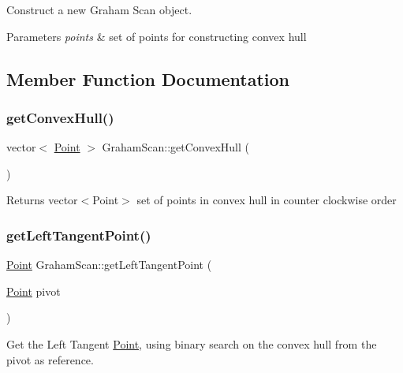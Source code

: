 Construct a new Graham Scan object. 


\begin{DoxyParams}{Parameters}
{\em points} & set of points for constructing convex hull \\
\hline
\end{DoxyParams}


\subsection{Member Function Documentation}
\mbox{\label{classGrahamScan_a374db012cb6a96fcb8530d07cddd498e}} 
\subsubsection{\texorpdfstring{get\+Convex\+Hull()}{getConvexHull()}}
{\footnotesize\ttfamily vector$<$ \mbox{\hyperlink{classPoint}{Point}} $>$ Graham\+Scan\+::get\+Convex\+Hull (\begin{DoxyParamCaption}{ }\end{DoxyParamCaption})}

\begin{DoxyReturn}{Returns}
vector$<$\+Point$>$ set of points in convex hull in counter clockwise order 
\end{DoxyReturn}
\mbox{\label{classGrahamScan_a25068b534491cef265e5d7c038f82e7d}} 
\subsubsection{\texorpdfstring{get\+Left\+Tangent\+Point()}{getLeftTangentPoint()}}
{\footnotesize\ttfamily \mbox{\hyperlink{classPoint}{Point}} Graham\+Scan\+::get\+Left\+Tangent\+Point (\begin{DoxyParamCaption}\item[{\mbox{\hyperlink{classPoint}{Point}}}]{pivot }\end{DoxyParamCaption})\hspace{0.3cm}{\ttfamily [private]}}



Get the Left Tangent \mbox{\hyperlink{classPoint}{Point}}, using binary search on the convex hull from the pivot as reference. 


